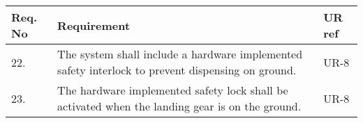 \begin{center}
    \begin{tabular}{ | l | p{9cm} | l |}
    \hline 
    Req. No & Requirement  & UR ref \\ \hline
    22. & The system shall include a hardware implemented safety interlock to prevent dispensing on ground.  &UR-8\\ \hline
	23. & The hardware implemented safety lock shall be activated when the landing gear is on the ground.&UR-8 \\ \hline
    \end{tabular}
\end{center}
